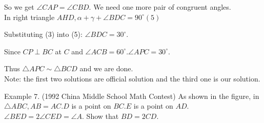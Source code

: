\documentclass[10pt]{article}
\begin{document}
So we get \(\angle C A P=\angle C B D\). We need one more pair of congruent angles.\\
In right triangle \(A H D, \alpha+\gamma+\angle B D C=90^{\circ}(5)\)

Substituting (3) into (5): \(\angle B D C=30^{\circ}\).

Since \(C P \perp B C\) at \(C\) and \(\angle A C B=60^{\circ} . \angle A P C=30^{\circ}\).

Thus \(\triangle A P C \sim \triangle B C D\) and we are done.\\
Note: the first two solutions are official solution and the third one is our solution.


Example 7. (1992 China Middle School Math Contest) As shown in the figure, in \(\triangle A B C, A B=A C . D\) is a point on \(B C . E\) is a point on \(A D\). \(\angle B E D=2 \angle C E D=\angle A\). Show that \(B D=2 C D\).
\end{document}
